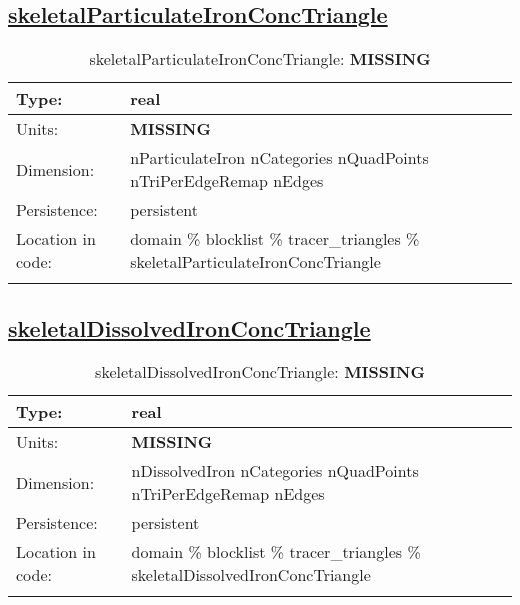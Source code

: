 \subsection[skeletalParticulateIronConcTriangle]{\hyperref[sec:var_tab_tracer_triangles]{skeletalParticulateIronConcTriangle}}
\label{subsec:var_sec_tracer_triangles_skeletalParticulateIronConcTriangle}
\begin{center}
\begin{longtable}{| p{2.0in} | p{4.0in} |}
        \hline 
        Type: & real \\
        \hline 
        Units: & {\bf \color{red} MISSING} \\
        \hline 
        Dimension: & nParticulateIron nCategories nQuadPoints nTriPerEdgeRemap nEdges \\
        \hline 
        Persistence: & persistent \\
        \hline 
         Location in code: & domain \% blocklist \% tracer\_triangles \% skeletalParticulateIronConcTriangle \\
         \hline 
    \caption{skeletalParticulateIronConcTriangle: {\bf \color{red} MISSING}}
\end{longtable}
\end{center}
\subsection[skeletalDissolvedIronConcTriangle]{\hyperref[sec:var_tab_tracer_triangles]{skeletalDissolvedIronConcTriangle}}
\label{subsec:var_sec_tracer_triangles_skeletalDissolvedIronConcTriangle}
\begin{center}
\begin{longtable}{| p{2.0in} | p{4.0in} |}
        \hline 
        Type: & real \\
        \hline 
        Units: & {\bf \color{red} MISSING} \\
        \hline 
        Dimension: & nDissolvedIron nCategories nQuadPoints nTriPerEdgeRemap nEdges \\
        \hline 
        Persistence: & persistent \\
        \hline 
         Location in code: & domain \% blocklist \% tracer\_triangles \% skeletalDissolvedIronConcTriangle \\
         \hline 
    \caption{skeletalDissolvedIronConcTriangle: {\bf \color{red} MISSING}}
\end{longtable}
\end{center}
